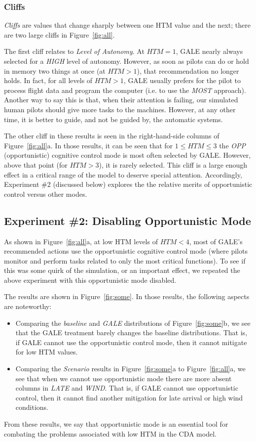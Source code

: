 \documentclass[journal]{IEEEtran}
\newcommand{\bi}{\begin{itemize}}
\newcommand{\ei}{\end{itemize}}
\newcommand{\fig}[1]{Figure~\ref{fig:#1}}
\newcommand{\ADD}[1]{#1}
\begin{document}
\subsubsection{Cliffs}

{\em Cliffs} are values that change sharply between one HTM value and the next; there are two large cliffs in \fig{all}.

The first cliff relates to {\em Level of Autonomy}. 
At $\mathit{HTM}=1$, GALE nearly always selected for a {\em HIGH} level of autonomy. 
However, as soon as pilots can do or hold in memory two things at once (at $\mathit{HTM}>1$), that recommendation no longer holds.  
In fact, for all levels of $\mathit{HTM}>1$, GALE usually prefers for the pilot to process flight data and program the computer (i.e. to use the {\em MOST} approach).
\ADD{Another way to say this is that, when their attention is failing, our simulated human pilots should give more tasks to the machines.}
However, at any other time, it is better to guide, and not be guided by, the automatic systems.

The other cliff in these results is seen in the right-hand-side columns of \fig{all}a. 
In those results, it can be seen that for  $1 \le \mathit{HTM} \le 3$ the {\em OPP} (opportunistic) cognitive control mode is most often selected by GALE. 
However, above that point (for $\mathit{HTM}>3$), it is rarely selected.
This cliff is a large enough effect in  a critical range of the model to deserve special attention.
Accordingly, Experiment \#2 (discussed below) explores the the relative merits of opportunistic control versus other modes.

\subsection{Experiment \#2: Disabling Opportunistic Mode}
As shown in \fig{all}a, at low HTM levels of $\mathit{HTM}<4$, most of GALE's recommended actions use the opportunistic cognitive control mode (where pilots monitor and perform tasks related to only the most critical functions). 
To see if this was some quirk of the simulation, or an important effect, we repeated the above experiment with this opportunistic mode disabled.

The results are shown in \fig{some}.  
In those results, the following aspects are noteworthy:
\bi
\item Comparing the {\em baseline} and {\em GALE} distributions of  \fig{some}b, we see that the GALE treatment barely changes the baseline distributions. 
That is, if GALE cannot use the opportunistic control mode, then it cannot mitigate for low HTM values.
\item
Comparing the {\em Scenario} results in \fig{some}a to \fig{all}a, we see that when we cannot use opportunistic mode there are more absent columns in {\em LATE} and {\em WIND}.
That is, if GALE cannot use opportunistic control, then it cannot find another mitigation for late arrival or high wind conditions.
\ei
From these results, we say that opportunistic mode is an essential tool for combating the problems associated with low HTM in the CDA model.
 
\end{document}
